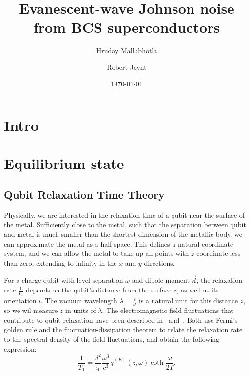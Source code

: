 \documentclass[%
 preprint,
 amsmath,amssymb,
 aps,
]{revtex4-2}
\begin{document}
\title{Evanescent-wave Johnson noise from BCS superconductors}

\author{Hruday Mallubhotla}
\author{Robert Joynt}

\date{\today}


\maketitle

\section{Intro} \label{sec:intro}

\section{Equilibrium state} \label{sec:equilibrium}

\subsection{Qubit Relaxation Time Theory} \label{subsec:relaxtime}
Physically, we are interested in the relaxation time of a qubit near the surface of the metal.
Sufficiently close to the metal, such that the separation between qubit and metal is much smaller than the shortest dimension of the metallic body, we can approximate the metal as a half space.
This defines a natural coordinate system, and we can allow the metal to take up all points with $z$-coordinate less than zero, extending to infinity in the $x$ and $y$ directions.

For a charge qubit with level separation $\omega$ and dipole moment $\vec{d}$, the relaxation rate $\frac{1}{T_1}$ depends on the qubit's distance from the surface $z$, as well as its orientation $i$.
The vacuum wavelength $\lambda = \frac{c}{\omega}$ is a natural unit for this distance $z$, so we wil measure $z$ in units of $\lambda$.
The electromagnetic field fluctuations that contribute to qubit relaxation have been described in~\cite{QubitRelax} and~\cite{Henkel1999}.
Both use Fermi's golden rule and the fluctuation-dissipation theorem to relate the relaxation rate to the spectral density of the field fluctuations, and obtain the following expression:
\begin{equation}
	\frac{1}{T_1} = \frac{d^2}{\epsilon_0} \frac{\omega^3}{c^3} \chi_{i}^{(E)}(z, \omega) \coth\frac{\omega}{2 T}.
\end{equation}
\end{document}
